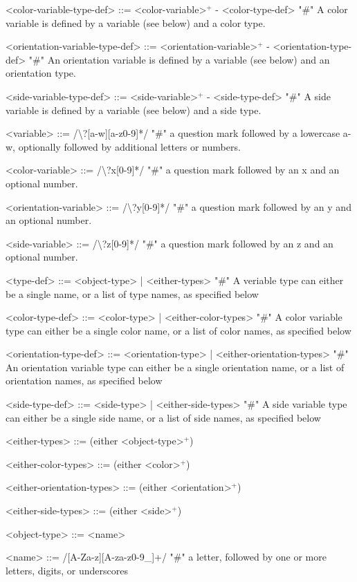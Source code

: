 \documentclass{article}
\begin{document}
\begin{grammar}
<color-variable-type-def> ::= <color-variable>$^+$ - <color-type-def> "#" A color variable is defined by a variable (see below) and a color type.

<orientation-variable-type-def> ::= <orientation-variable>$^+$ - <orientation-type-def> "#" An orientation variable is defined by a variable (see below) and an orientation type.

<side-variable-type-def> ::= <side-variable>$^+$ - <side-type-def> "#" A side variable is defined by a variable (see below) and a side type.

<variable> ::= /\textbackslash?[a-w][a-z0-9]*/  "#" a question mark followed by a lowercase a-w, optionally followed by additional letters or numbers.

<color-variable> ::= /\textbackslash?x[0-9]*/  "#" a question mark followed by an x and an optional number.

<orientation-variable> ::= /\textbackslash?y[0-9]*/  "#" a question mark followed by an y and an optional number.

<side-variable> ::= /\textbackslash?z[0-9]*/  "#" a question mark followed by an z and an optional number.

<type-def> ::= <object-type> | <either-types> "#" A veriable type can either be a single name, or a list of type names, as specified below

<color-type-def> ::= <color-type> | <either-color-types> "#" A color variable type can either be a single color name, or a list of color names, as specified below

<orientation-type-def> ::= <orientation-type> | <either-orientation-types> "#" An orientation variable type can either be a single orientation name, or a list of orientation names, as specified below

<side-type-def> ::= <side-type> | <either-side-types> "#" A side variable type can either be a single side name, or a list of side names, as specified below

<either-types> ::= (either <object-type>$^+$)

<either-color-types> ::= (either <color>$^+$)

<either-orientation-types> ::= (either <orientation>$^+$)

<either-side-types> ::= (either <side>$^+$)

<object-type> ::= <name>

<name> ::= /[A-Za-z][A-za-z0-9\_]+/  "#" a letter, followed by one or more letters, digits, or underscores


\end{grammar}
\end{document}
